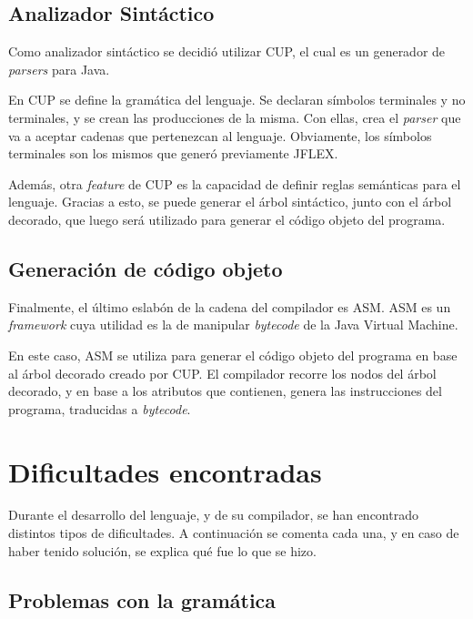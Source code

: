\documentclass{article}
\begin{document}
        \subsection{Analizador Sintáctico}
            \par Como analizador sintáctico se decidió utilizar CUP, el cual es un generador de \textit{parsers} para Java. 
            \par En CUP se define la gramática del lenguaje. Se declaran símbolos terminales y no terminales, y se crean las producciones de la misma. Con ellas, crea el \textit{parser} que va a aceptar cadenas que pertenezcan al lenguaje. Obviamente, los símbolos terminales son los mismos que generó previamente JFLEX.
            \par Además, otra \textit{feature} de CUP es la capacidad de definir reglas semánticas para el lenguaje. Gracias a esto, se puede generar el árbol sintáctico, junto con el árbol decorado, que luego será utilizado para generar el código objeto del programa.

        \subsection{Generación de código objeto}
            \par Finalmente, el último eslabón de la cadena del compilador es ASM. ASM es un \textit{framework} cuya utilidad es la de manipular \textit{bytecode} de la Java Virtual Machine.
            \par En este caso, ASM se utiliza para generar el código objeto del programa en base al árbol decorado creado por CUP. El compilador recorre los nodos del árbol decorado, y en base a los atributos que contienen, genera las instrucciones del programa, traducidas a \textit{bytecode}.

        \clearpage

    \section{Dificultades encontradas}
        \par Durante el desarrollo del lenguaje, y de su compilador, se han encontrado distintos tipos de dificultades. A continuación se comenta cada una, y en caso de haber tenido solución, se explica qué fue lo que se hizo.

        \subsection{Problemas con la gramática}
            \par 
\end{document}
